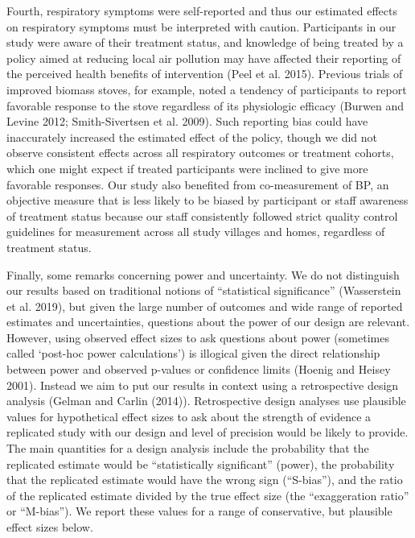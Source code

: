 \documentclass[
  letterpaper,
  DIV=11,
  numbers=noendperiod]{scrartcl}
\begin{document}
Fourth, respiratory symptoms were self-reported and thus our estimated
effects on respiratory symptoms must be interpreted with caution.
Participants in our study were aware of their treatment status, and
knowledge of being treated by a policy aimed at reducing local air
pollution may have affected their reporting of the perceived health
benefits of intervention (Peel et al. 2015). Previous trials of improved
biomass stoves, for example, noted a tendency of participants to report
favorable response to the stove regardless of its physiologic efficacy
(Burwen and Levine 2012; Smith-Sivertsen et al. 2009). Such reporting
bias could have inaccurately increased the estimated effect of the
policy, though we did not observe consistent effects across all
respiratory outcomes or treatment cohorts, which one might expect if
treated participants were inclined to give more favorable responses. Our
study also benefited from co-measurement of BP, an objective measure
that is less likely to be biased by participant or staff awareness of
treatment status because our staff consistently followed strict quality
control guidelines for measurement across all study villages and homes,
regardless of treatment status.

Finally, some remarks concerning power and uncertainty. We do not
distinguish our results based on traditional notions of ``statistical
significance'' (Wasserstein et al. 2019), but given the large number of
outcomes and wide range of reported estimates and uncertainties,
questions about the power of our design are relevant. However, using
observed effect sizes to ask questions about power (sometimes called
`post-hoc power calculations') is illogical given the direct
relationship between power and observed p-values or confidence limits
(Hoenig and Heisey 2001). Instead we aim to put our results in context
using a retrospective design analysis (Gelman and Carlin (2014)).
Retrospective design analyses use plausible values for hypothetical
effect sizes to ask about the strength of evidence a replicated study
with our design and level of precision would be likely to provide. The
main quantities for a design analysis include the probability that the
replicated estimate would be ``statistically significant'' (power), the
probability that the replicated estimate would have the wrong sign
(``S-bias''), and the ratio of the replicated estimate divided by the
true effect size (the ``exaggeration ratio'' or ``M-bias''). We report
these values for a range of conservative, but plausible effect sizes
below.
\end{document}
